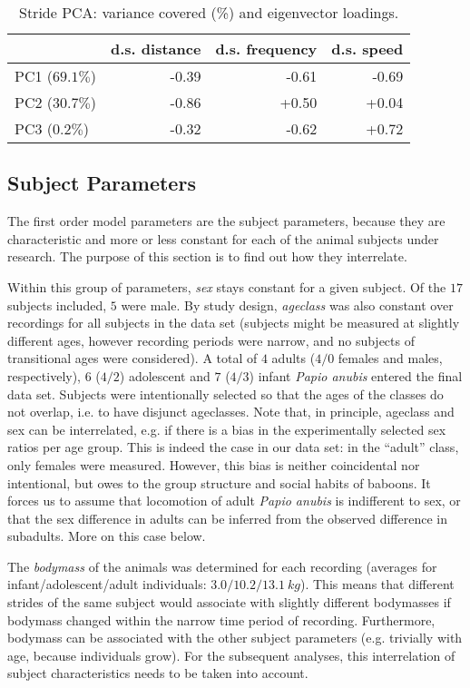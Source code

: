 \begin{table}[p]
\caption{\label{tab:stridepca}Stride PCA: variance covered (\%) and eigenvector loadings.}
\centering
\begin{tabular}{l|rrr}
 & d.s. distance & d.s. frequency & d.s. speed\\[0pt]
\hline
PC1 (\(69.1 \%\)) & -0.39 & -0.61 & -0.69\\[0pt]
PC2 (\(30.7 \%\)) & -0.86 & +0.50 & +0.04\\[0pt]
PC3 (\(0.2 \%\)) & -0.32 & -0.62 & +0.72\\[0pt]
\end{tabular}
\end{table}

\clearpage
\subsection{Subject Parameters}
\label{sec:orgb7153d3}
The first order model parameters are the subject parameters, because they are characteristic and more or less constant for each of the animal subjects under research.
The purpose of this section is to find out how they interrelate.

Within this group of parameters, \emph{sex} stays constant for a given subject.
Of the \(17\) subjects included, \(5\) were male.
By study design, \emph{ageclass} was also constant over recordings for all subjects in the data set (subjects might be measured at slightly different ages, however recording periods were narrow, and no subjects of transitional ages were considered).
A total of
\(4\) adults (\(4/0\) females and males, respectively),
\(6\) (\(4/2\)) adolescent
and \(7\) (\(4/3\)) infant
\emph{Papio anubis} entered the final data set.
Subjects were intentionally selected so that the ages of the classes do not overlap, i.e. to have disjunct ageclasses.
Note that, in principle, ageclass and sex can be interrelated, e.g. if there is a bias in the experimentally selected sex ratios per age group.
This is indeed the case in our data set: in the ``adult'' class, only females were measured.
However, this bias is neither coincidental nor intentional, but owes to the group structure and social habits of baboons.
It forces us to assume that locomotion of adult \emph{Papio anubis} is indifferent to sex, or that the sex difference in adults can be inferred from the observed difference in subadults.
More on this case below.


The \emph{bodymass} of the animals was determined for each recording (averages for infant/adolescent/adult individuals: \(3.0/10.2/13.1\ kg\)).
This means that different strides of the same subject would associate with slightly different bodymasses if bodymass changed within the narrow time period of recording.
Furthermore, bodymass can be associated with the other subject parameters (e.g. trivially with age, because individuals grow).
For the subsequent analyses, this interrelation of subject characteristics needs to be taken into account.


